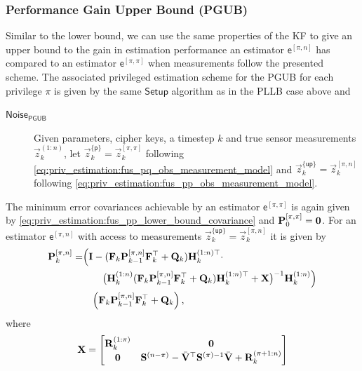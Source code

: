 \subsubsection{Performance Gain Upper Bound (PGUB)}
Similar to the lower bound, we can use the same properties of the KF to give an upper bound to the gain in estimation performance an estimator $\mathsf{e}^{[\pi,n]}$ has compared to an estimator $\mathsf{e}^{[\pi,\pi]}$ when measurements follow the presented scheme. The associated privileged estimation scheme for the PGUB for each privilege $\pi$ is given by the same $\mathsf{Setup}$ algorithm as in the PLLB case above and
\begin{description}
  \item[$\mathsf{Noise}_{\mathsf{PGUB}}$] Given parameters, cipher keys, a timestep $k$ and true sensor measurements $\vec{z}_k^{(1:n)}$, let $\vec{z}_k^{\{\mathsf{p}\}}=\vec{z}_k^{[\pi,\pi]}$ following \eqref{eq:priv_estimation:fus_pq_obs_measurement_model} and $\vec{z}_k^{\{\mathsf{up}\}}=\vec{z}_k^{[\pi,n]}$ following \eqref{eq:priv_estimation:fus_pp_obs_measurement_model}.
\end{description}
The minimum error covariances achievable by an estimator $\mathsf{e}^{[\pi,\pi]}$ is again given by \eqref{eq:priv_estimation:fus_pp_lower_bound_covariance} and ${{\mathbf{P}}}_0^{[\pi,\pi]} = {{\mathbf{0}}}$. For an estimator $\mathsf{e}^{[\pi,n]}$ with access to measurements $\vec{z}_k^{\{\mathsf{up}\}}=\vec{z}_k^{[\pi,n]}$ it is given by
\begin{equation}\label{eq:priv_estimation:fus_pn_lower_bound_covariance}
  \begin{split}
    {\ensuremath{{\mathbf{P}}}}_k^{[\pi,n]} =& \Bigl( {{\mathbf{I}}} - ({{\mathbf{F}}}_k{{\mathbf{P}}}_{k-1}^{[\pi,n]}{{\mathbf{F}}}_k^\top + {{\mathbf{Q}}}_k){{\mathbf{H}}}_k^{(1:n)\top} \cdot \\
    &\qquad\bigl({{\mathbf{H}}}_k^{(1:n)}({{\mathbf{F}}}_k{{\mathbf{P}}}_{k-1}^{[\pi,n]}{{\mathbf{F}}}_k^\top + {{\mathbf{Q}}}_k){{\mathbf{H}}}_k^{(1:n)\top}+ {{\mathbf{X}}}\bigr)^{-1}{{\mathbf{H}}}_k^{(1:n)}\Bigr)\\
    &\quad\Bigl({{\mathbf{F}}}_k{{\mathbf{P}}}_{k-1}^{[\pi,n]}{{\mathbf{F}}}_k^\top + {{\mathbf{Q}}}_k\Bigr)\,,
 \end{split}
\end{equation}
where
\begin{equation}
  {\ensuremath{{\mathbf{X}}}} = 
  \begin{bmatrix}
    {\ensuremath{{\mathbf{R}}}}_k^{(1:\pi)} & {{\mathbf{0}}}\\
    {{\mathbf{0}}} & {{\mathbf{S}}}^{(n-\pi)} - \bar{{{\mathbf{V}}}}^\top{\ensuremath{{\mathbf{S}}}}^{(\pi)-1}\bar{{{\mathbf{V}}}} + {{\mathbf{R}}}_k^{(\pi+1:n)}
  \end{bmatrix}
\end{equation}
